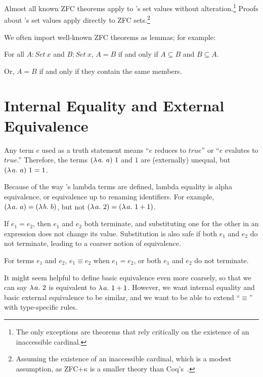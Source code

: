 Almost all known ZFC theorems apply to \lzfclang's set values without alteration.\footnote{The only exceptions are theorems that rely critically on the existence of an inaccessible cardinal.}
Proofs about \lzfclang's set values apply directly to ZFC sets.\footnote{Assuming the existence of an inaccessible cardinal, which is a modest assumption, as ZFC+$\kappa$ is a smaller theory than Coq's~\cite{cit:barras-2010-sets-coq}.}

We often import well-known ZFC theorems as lemmas; for example:

\begin{lemma}
For all $A : Set~x$ and $B : Set~x$, $A = B$ if and only if $A \subseteq B$ and $B \subseteq A$.
\end{lemma}
Or, $A = B$ if and only if they contain the same members.

\section{Internal Equality and External Equivalence}

Any \lzfclang term $\mathit{e}$ used as a truth statement means ``$\mathit{e}$ reduces to $true$'' or ``$\mathit{e}$ evalutes to $true$.''
Therefore, the terms $(\lambda\mspace{2mu}{a}\ldotp\,{a})~1$ and $1$ are (externally) unequal, but $(\lambda\mspace{2mu}{a}\ldotp\,{a})~1 = 1$.

Because of the way \lzfclang's lambda terms are defined, lambda equality is alpha equivalence, or equivalence up to renaming identifiers.
For example, $(\lambda\mspace{2mu}{a}\ldotp\,{a}) = (\lambda\mspace{2mu}{b}\ldotp\,{b})$, but not $(\lambda\mspace{2mu}{a}\ldotp\,{2}) = (\lambda\mspace{2mu}{a}\ldotp\,{1+1})$.

If $\mathit{e}_1 = \mathit{e}_2$, then $\mathit{e}_1$ and $\mathit{e}_2$ both terminate, and substituting one for the other in an expression does not change its value.
Substitution is also safe if both $\mathit{e}_1$ and $\mathit{e}_2$ do not terminate, leading to a coarser notion of equivalence.

\begin{definition}
For terms $\mathit{e_1}$ and $\mathit{e_2}$, $\mathit{e_1} \equiv \mathit{e_2}$ when $\mathit{e_1} = \mathit{e_2}$, or both $\mathit{e_1}$ and $\mathit{e_2}$ do not terminate.
\end{definition}

It might seem helpful to define basic equivalence even more coarsely, so that we can say $\lambda\mspace{2mu}{a}\ldotp\, 2$ is equivalent to $\lambda\mspace{2mu}{a}\ldotp\,{1+1}$.
However, we want internal equality and basic external equivalence to be similar, and we want to be able to extend ``$\equiv$'' with type-specific rules.

